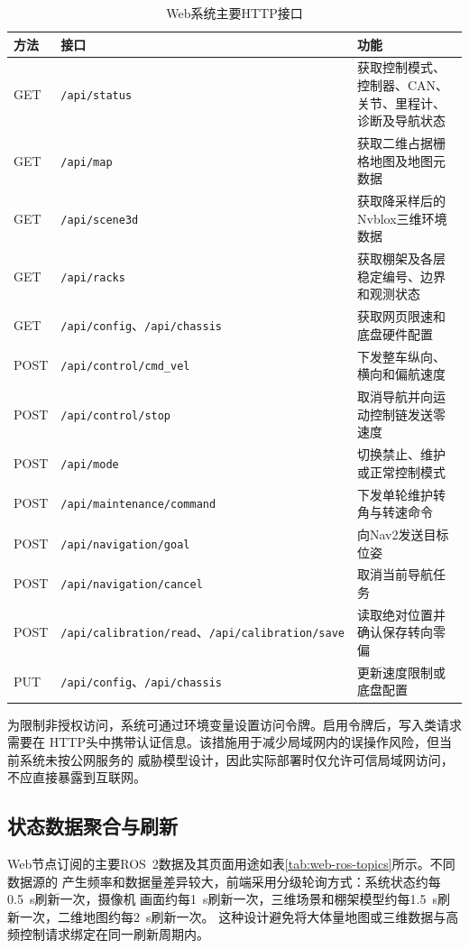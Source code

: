 \begin{table}[htbp]
    \centering
    \caption{Web系统主要HTTP接口}
    \label{tab:web-api}
    \begin{tabularx}{\textwidth}{p{1.4cm}p{5.1cm}X}
        \toprule
        方法 & 接口 & 功能 \\
        \midrule
        GET & \texttt{/api/status} & 获取控制模式、控制器、CAN、关节、里程计、诊断及导航状态 \\
        GET & \texttt{/api/map} & 获取二维占据栅格地图及地图元数据 \\
        GET & \texttt{/api/scene3d} & 获取降采样后的Nvblox三维环境数据 \\
        GET & \texttt{/api/racks} & 获取棚架及各层稳定编号、边界和观测状态 \\
        GET & \texttt{/api/config}、\texttt{/api/chassis} & 获取网页限速和底盘硬件配置 \\
        POST & \texttt{/api/control/cmd\_vel} & 下发整车纵向、横向和偏航速度 \\
        POST & \texttt{/api/control/stop} & 取消导航并向运动控制链发送零速度 \\
        POST & \texttt{/api/mode} & 切换禁止、维护或正常控制模式 \\
        POST & \texttt{/api/maintenance/command} & 下发单轮维护转角与转速命令 \\
        POST & \texttt{/api/navigation/goal} & 向Nav2发送目标位姿 \\
        POST & \texttt{/api/navigation/cancel} & 取消当前导航任务 \\
        POST & \texttt{/api/calibration/read}、\texttt{/api/calibration/save} & 读取绝对位置并确认保存转向零偏 \\
        PUT & \texttt{/api/config}、\texttt{/api/chassis} & 更新速度限制或底盘配置 \\
        \bottomrule
    \end{tabularx}
\end{table}

为限制非授权访问，系统可通过环境变量设置访问令牌。启用令牌后，写入类请求需要在
HTTP头中携带认证信息。该措施用于减少局域网内的误操作风险，但当前系统未按公网服务的
威胁模型设计，因此实际部署时仅允许可信局域网访问，不应直接暴露到互联网。

\subsection{状态数据聚合与刷新}

Web节点订阅的主要ROS~2数据及其页面用途如表\ref{tab:web-ros-topics}所示。不同数据源的
产生频率和数据量差异较大，前端采用分级轮询方式：系统状态约每0.5~s刷新一次，摄像机
画面约每1~s刷新一次，三维场景和棚架模型约每1.5~s刷新一次，二维地图约每2~s刷新一次。
这种设计避免将大体量地图或三维数据与高频控制请求绑定在同一刷新周期内。

